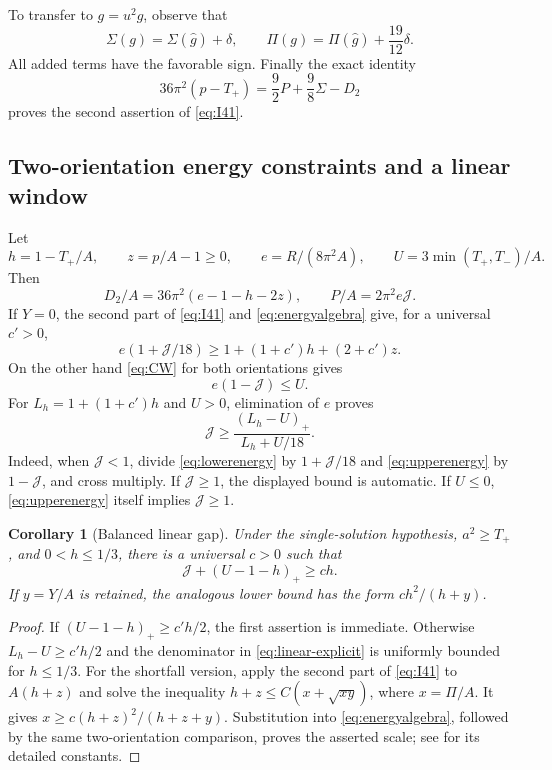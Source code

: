 \documentclass[11pt,a4paper]{article}
\newtheorem{corollary}[theorem]{Corollary}
\theoremstyle{definition}
\theoremstyle{remark}
\newcommand{\J}{\mathcal J}
\begin{document}
To transfer to $g=u^2\widehat g$, observe that
\[
 \Sigma(g)=\Sigma(\widehat g)+\delta,\qquad
 \Pi(g)=\Pi(\widehat g)+\frac{19}{12}\delta.
\]
All added terms have the favorable sign. Finally the exact identity
\begin{equation}
 36\pi^2(p-T_+)=\frac92P+\frac98\Sigma-D_2
 \label{eq:class-excess}
\end{equation}
proves the second assertion of \eqref{eq:I41}.

\subsection{Two-orientation energy constraints and a linear window}
Let
\[
 h=1-T_+/A,\qquad z=p/A-1\ge0,\qquad
 e=R/(8\pi^2A),\qquad U=3\min(T_+,T_-)/A.
\]
Then
\begin{equation}
 D_2/A=36\pi^2(e-1-h-2z),\qquad
 P/A=2\pi^2e\J.
 \label{eq:energyalgebra}
\end{equation}
If $Y=0$, the second part of \eqref{eq:I41} and \eqref{eq:energyalgebra} give, for a universal $c'>0$,
\begin{equation}
 e(1+\J/18)\ge1+(1+c')h+(2+c')z.
 \label{eq:lowerenergy}
\end{equation}
On the other hand \eqref{eq:CW} for both orientations gives
\begin{equation}
 e(1-\J)\le U.
 \label{eq:upperenergy}
\end{equation}
For $L_h=1+(1+c')h$ and $U>0$, elimination of $e$ proves
\begin{equation}
 \J\ge\frac{(L_h-U)_+}{L_h+U/18}.
 \label{eq:linear-explicit}
\end{equation}
Indeed, when $\J<1$, divide \eqref{eq:lowerenergy} by $1+\J/18$ and \eqref{eq:upperenergy} by $1-\J$, and cross multiply. If $\J\ge1$, the displayed bound is automatic. If $U\le0$, \eqref{eq:upperenergy} itself implies $\J\ge1$.

\begin{corollary}[Balanced linear gap]\label{cor:linear}
Under the single-solution hypothesis, $a^2\ge T_+$, and $0<h\le1/3$, there is a universal $c>0$ such that
\begin{equation}
 \J+(U-1-h)_+\ge ch.
 \label{eq:linearwindow}
\end{equation}
If $y=Y/A$ is retained, the analogous lower bound has the form $ch^2/(h+y)$.
\end{corollary}
\begin{proof}
If $(U-1-h)_+\ge c'h/2$, the first assertion is immediate. Otherwise $L_h-U\ge c'h/2$ and the denominator in \eqref{eq:linear-explicit} is uniformly bounded for $h\le1/3$. For the shortfall version, apply the second part of \eqref{eq:I41} to $A(h+z)$ and solve the inequality $h+z\le C(x+\sqrt{xy})$, where $x=\Pi/A$. It gives $x\ge c(h+z)^2/(h+z+y)$. Substitution into \eqref{eq:energyalgebra}, followed by the same two-orientation comparison, proves the asserted scale; see \cite{Conformal} for its detailed constants.
\end{proof}
\end{document}
